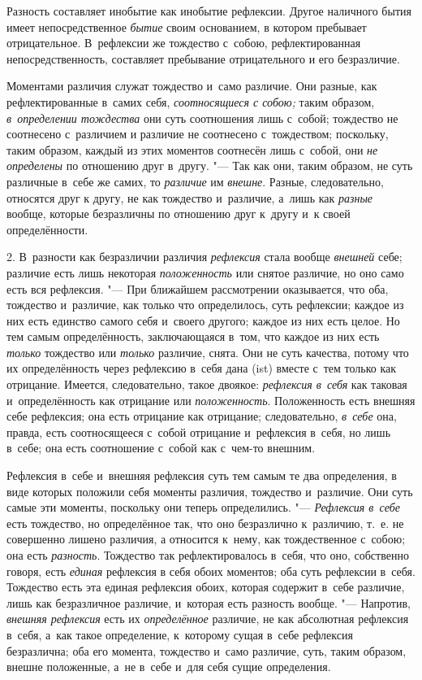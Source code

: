 Разность составляет инобытие как инобытие рефлексии. Другое наличного бытия
имеет непосредственное {\em бытие} своим основанием, в
котором пребывает отрицательное. В~рефлексии же тождество с~собою,
рефлектированная непосредственность, составляет пребывание отрицательного и
его безразличие.

Моментами различия служат тождество и~само различие. Они разные, как
рефлектированные в~самих себя, {\em соотносящиеся с
собою;} таким образом, {\em в~определении тождества}
они суть соотношения лишь с~собой; тождество не соотнесено с~различием и
различие не соотнесено с~тождеством; поскольку, таким образом, каждый из
этих моментов соотнесён лишь с~собой, они {\em не
определены} по отношению друг в~другу. "--- Так как они, таким образом, не
суть различные в~себе же самих, то {\em различие} им
{\em внешне}. Разные, следовательно, относятся друг к
другу, не как тождество и~различие, а~лишь как
{\em разные} вообще, которые безразличны по отношению
друг к~другу и~к своей определённости.

2. В~разности как безразличии различия {\em рефлексия}
стала вообще {\em внешней} себе; различие есть лишь
некоторая {\em положенность} или снятое различие, но
оно само есть вся рефлексия. "--- При ближайшем рассмотрении оказывается, что
оба, тождество и~различие, как только что определилось, суть рефлексии;
каждое из них есть единство самого себя и~своего другого; каждое из них
есть целое. Но тем самым определённость, заключающаяся в~том, что каждое из
них есть {\em только} тождество или
{\em только} различие, снята. Они не суть качества,
потому что их определённость через рефлексию в~себя дана (ist) вместе с~тем
только как отрицание. Имеется, следовательно, такое двоякое:
{\em рефлексия в~себя} как таковая и~определённость
как отрицание или {\em положенность}. Положенность есть
внешняя себе рефлексия; она есть отрицание как отрицание; следовательно,
{\em в~себе} она, правда, есть соотносящееся с~собой
отрицание и~рефлексия в~себя, но лишь в~себе; она есть соотношение с~собой
как с~чем-то внешним.

Рефлексия в~себе и~внешняя рефлексия суть тем самым те два определения, в
виде которых положили себя моменты различия, тождество и~различие. Они суть
самые эти моменты, поскольку они теперь определились. "---
{\em Рефлексия в~себе} есть тождество, но определённое
так, что оно безразлично к~различию, т.~е. не совершенно лишено различия, а
относится к~нему, как тождественное с~собою; она есть
{\em разность}. Тождество так рефлектировалось в~себя,
что оно, собственно говоря, есть {\em единая} рефлексия
в себя обоих моментов; оба суть рефлексии в~себя. Тождество есть эта единая
рефлексия обоих, которая содержит в~себе различие, лишь как безразличное
различие, и~которая есть разность вообще. "--- Напротив,
{\em внешняя рефлексия} есть их
{\em определённое} различие, не как абсолютная
рефлексия в~себя, а~как такое определение, к~которому сущая в~себе
рефлексия безразлична; оба его момента, тождество и~само различие, суть,
таким образом, внешне положенные, а~не в~себе и~для себя сущие определения.

